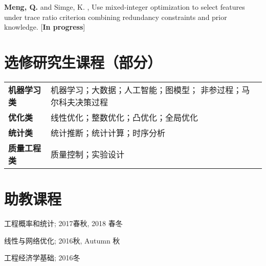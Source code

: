 \documentclass[margin,line,11pt]{resume}
\begin{document}
\begin{resume}
        \vspace{-0.5em}
        
       \textbf{Meng, Q.} and Simge, K. , Use mixed-integer optimization to select features under trace ratio criterion combining redundancy constraints and prior knowledge. [\textbf{In progress}]
        
                \vspace{-0.5em}\section{\mysidestyle 选修研究生课程（部分）}
\vspace{0.5em}
	\begin{tabular}{ll }
          \textbf{机器学习类} & 机器学习；大数据；人工智能；图模型；
非参过程；马尔科夫决策过程\\
  \textbf{优化类} & 线性优化；整数优化；凸优化；全局优化\\
   \textbf{统计类}& 统计推断；统计计算；时序分析\\
\textbf{质量工程类} & 质量控制；实验设计 \\
	\end{tabular}

 


                \vspace{-0.5em}\section{\mysidestyle 助教课程}
        \begin{list2}
        \item   工程概率和统计;  2017春秋, 2018 春冬
        \item   线性与网络优化; 2016秋, Autumn 秋
        \item  工程经济学基础;  2016冬
        \end{list2}
        

\end{resume}
\end{document}
